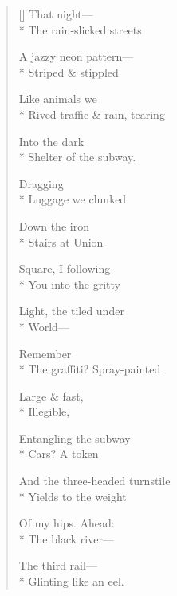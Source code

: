 \label{ch:leaving_new_york}
\begin{verse}[\versewidth]
That night---\\*
The rain-slicked streets

A jazzy neon pattern---\\*
Striped \& stippled

Like animals we\\*
Rived traffic \& rain, tearing

Into the dark\\*
Shelter of the subway.

\hspace*{4\vgap} Dragging\\*
Luggage we clunked

Down the iron\\*
Stairs at Union

Square, I following\\*
You into the gritty

Light, the tiled under\\*
World---

Remember\\*
The graffiti?     Spray-painted

Large \& fast,\\*
Illegible,

Entangling the subway\\*
Cars?   A token

And the three-headed turnstile\\*
Yields to the weight

Of my hips. Ahead:\\*
The black river---

The third rail---\\*
Glinting like an eel.
\end{verse}
